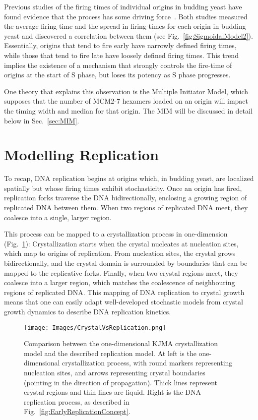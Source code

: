 		Previous studies of the firing times of individual origins in budding yeast have found evidence that the process has some driving force~\cite{ScottsPaper,StochasticTermination}.
		Both studies measured the average firing time and the spread in firing times for each origin in budding yeast and discovered a correlation between them (see Fig.~\ref{fig:SigmoidalModel2}).
		Essentially, origins that tend to fire early have narrowly defined firing times, while those that tend to fire late have loosely defined firing times.
		This trend implies the existence of a mechanism that strongly controls the fire-time of origins at the start of S phase, but loses its potency as S phase progresses.
		
		One theory that explains this observation is the Multiple Initiator Model, which supposes that the number of MCM2-7 hexamers loaded on an origin will impact the timing width and median for that origin.
		The MIM will be discussed in detail below in Sec.~\ref{sec:MIM}.
		
		
	\section{Modelling Replication}
	\label{sec:Modelling}
	
	To recap, DNA replication begins at origins which, in budding yeast, are localized spatially but whose firing times exhibit stochasticity.
	Once an origin has fired, replication forks traverse the DNA bidirectionally, enclosing a growing region of replicated DNA between them.
	When two regions of replicated DNA meet, they coalesce into a single, larger region.
	
	This process can be mapped to a crystallization process in one-dimension (Fig.~\ref{fig:CrystalVsReplication}):
	Crystallization starts when the crystal nucleates at nucleation sites, which map to origins of replication.
	From nucleation sites, the crystal grows bidirectionally, and the crystal domain is surrounded by boundaries that can be mapped to the replicative forks.
	Finally, when two crystal regions meet, they coalesce into a larger region, which matches the coalescence of neighbouring regions of replicated DNA.
	This mapping of DNA replication to crystal growth means that one can easily adapt well-developed stochastic models from crystal growth dynamics to describe DNA replication kinetics.
	
	\begin{figure}[tbh]
		\begin{center}
			\texttt{[image: Images/CrystalVsReplication.png]}
		\end{center}
			\caption[Comparing Crystallization with Replication]{\label{fig:CrystalVsReplication} Comparison between the one-dimensional KJMA crystallization model and the described replication model.
				At left is the one-dimensional crystallization process, with round markers representing nucleation sites, and arrows representing crystal boundaries (pointing in the direction of propagation).
				Thick lines represent crystal regions and thin lines are liquid.
				Right is the DNA replication process, as described in Fig.~\ref{fig:EarlyReplicationConcept}.}
	\end{figure}
	
